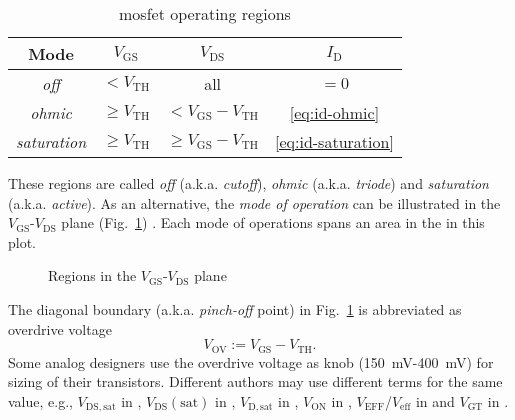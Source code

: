 \documentclass{article}[11pt]
\begin{document}
\begin{table}[H]
\centering
\caption{\gls{mosfet} operating regions}
\begin{tabular}{cccc}
\toprule
Mode                 & $V_{\mathrm{GS}}$      & $V_{\mathrm{DS}}$                     & $I_{\mathrm{D}}$         \\ \midrule
\textit{off}         & $<V_{\mathrm{TH}}$     & all                                   & $=0$                     \\ 
\textit{ohmic}       & $\geq V_{\mathrm{TH}}$ & $< V_{\mathrm{GS}}-V_{\mathrm{TH}}$   & \eqref{eq:id-ohmic}      \\ 
\textit{saturation}  & $\geq V_{\mathrm{TH}}$ & $\geq V_{\mathrm{GS}}-V_{\mathrm{TH}}$& \eqref{eq:id-saturation} \\ \toprule
\end{tabular}
\label{tab:regions}
\end{table}

These regions are called \textit{off} (a.k.a. \textit{cutoff}), 
\textit{ohmic} (a.k.a. \textit{triode}) 
and \textit{saturation} (a.k.a. \textit{active}).
As an alternative, the \textit{mode of operation} can be illustrated in the
$V_{\mathrm{GS}}$-$V_{\mathrm{DS}}$ plane 
(Fig.~\ref{fig:squarelawregionplot}) .
Each mode of operations spans an area in the in this plot.

\begin{figure}[H]
  \centering
  \begin{tikzpicture}[scale=1.2]
    
  \end{tikzpicture}
  \caption{Regions in the $V_{\mathrm{GS}}$-$V_{\mathrm{DS}}$ plane}
  \label{fig:squarelawregionplot}
\end{figure}

The diagonal boundary  (a.k.a. \textit{pinch-off} point) in
Fig.~\ref{fig:squarelawregionplot} is abbreviated as overdrive voltage
\begin{equation}\label{eq:vov}
  V_{\mathrm{OV}} := V_{\mathrm{GS}}-V_{\mathrm{TH}}.
\end{equation}
Some analog designers use the overdrive voltage as knob 
(\SI{150}{\milli\volt}-\SI{400}{\milli\volt}) for sizing of their transistors.
Different authors may use different terms for the same value,
e.g., $V_{\mathrm{DS,sat}}$ in \cite{baker-cmoscircdesnsim-10}, 
$V_{\mathrm{DS}}(\mathrm{sat})$ in \cite{allen-cmosancirdes-12},
$V_{\mathrm{D,sat}}$ in \cite{razavi-desanacmosic-15}, 
$V_{\mathrm{ON}}$ in \cite{allen-cmosancirdes-12},
$V_{\mathrm{EFF}}$/$V_{\mathrm{eff}}$ in 
\cite{binkley-tradeoffoptanalogcmos-08,johnsmartin-aicd-12} and
$V_{\mathrm{GT}}$ in \cite{huijsing-opamp-17}.
\end{document}
